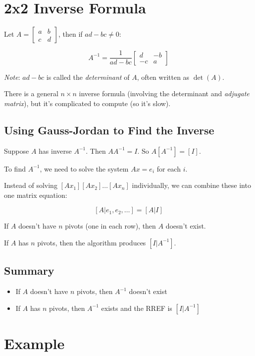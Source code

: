 \documentclass[12pt,a4paper]{article}
\begin{document}
\section{2x2 Inverse Formula}

Let $A = \begin{bmatrix} a & b \\ c & d \end{bmatrix}$, then if $ad-bc \neq 0$:

\[A^{-1} = \frac{1}{ad-bc} \begin{bmatrix} d & -b \\ -c & a \end{bmatrix}\]

\textit{Note}: $ad-bc$ is called the \textit{determinant} of $A$, often written as $\det(A)$.

There is a general $n \times n$ inverse formula (involving the determinant and \textit{adjugate matrix}), but it's complicated to compute (so it's slow).

\subsection{Using Gauss-Jordan to Find the Inverse}

Suppose $A$ has inverse $A^{-1}$.
Then $AA^{-1} = I$.
So $A[A^{-1}] = [I]$.

To find $A^{-1}$, we need to solve the system $Ax = e_i$ for each $i$.

Instead of solving $[Ax_1] [Ax_2] \ldots [Ax_n]$ individually, we can combine these into one matrix equation:

\[[A|e_1, e_2, \ldots] = [A|I]\]

If $A$ doesn't have $n$ pivots (one in each row), then $A$ doesn't exist.

If $A$ has $n$ pivots, then the algorithm produces $[I|A^{-1}]$.

\subsection{Summary}

\begin{itemize}
    \item If $A$ doesn't have $n$ pivots, then $A^{-1}$ doesn't exist
    \item If $A$ has $n$ pivots, then $A^{-1}$ exists and the RREF is $[I|A^{-1}]$
\end{itemize}

\section{Example}
\end{document}
